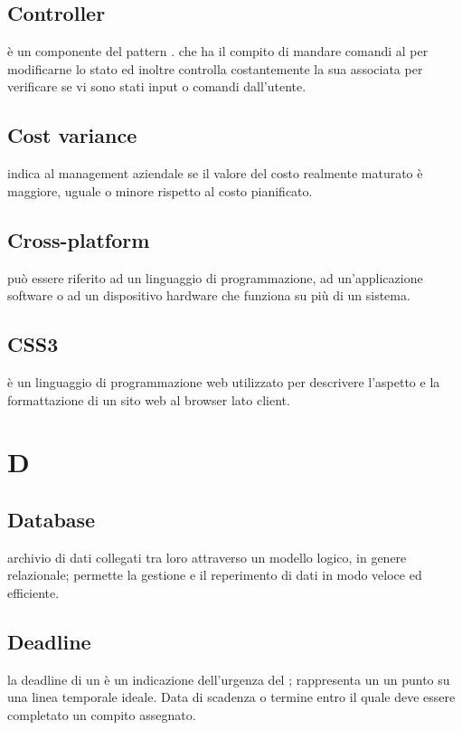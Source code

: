 \documentclass[12pt,a4paper]{article}
\begin{document}
\subsection{Controller} 
 è un componente del pattern . che ha il compito di mandare comandi al  per modificarne lo stato ed inoltre controlla costantemente la sua  associata per verificare se vi sono stati input o comandi dall'utente.

\subsection{Cost variance} 
 indica al management aziendale se il valore del costo realmente maturato è maggiore, uguale o minore rispetto al costo pianificato.

\subsection{Cross-platform} 
 può essere riferito ad un linguaggio di programmazione, ad un'applicazione software o ad un dispositivo hardware che funziona su più di un sistema.

\subsection{CSS3} 
 è un linguaggio di programmazione web utilizzato per descrivere l'aspetto e la formattazione di un sito web al browser lato client.


\newpage

\section{D}


\subsection{Database} 
 archivio di dati collegati tra loro attraverso un modello logico, in genere relazionale; permette la gestione e il reperimento di dati in modo veloce ed efficiente.

\subsection{Deadline} 
 la deadline di un  è un indicazione dell'urgenza del ; rappresenta un un punto su una linea temporale ideale. Data di scadenza o termine entro il quale deve essere completato un compito assegnato.
\end{document}
